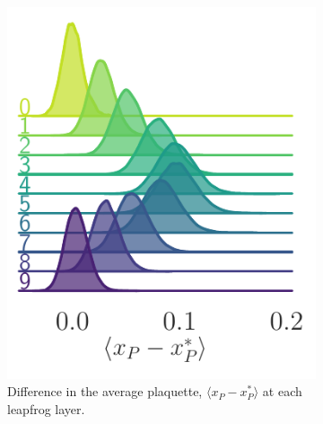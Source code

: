 \documentclass{article} %
\begin{document}
\begin{figure}[hbpt]
   \begin{subfigure}[b]{0.33\textwidth}
      \includegraphics[width=\textwidth]{figures/ridgeplots/plaqsf.pdf}
      \caption{\label{fig:plaqsf}Difference in the average plaquette, \(\langle x_{P}-x_{P}^{*}\rangle\) at each
      leapfrog layer.}
   \end{subfigure}
   \hfill
   \begin{subfigure}[b]{0.315\textwidth}

\end{subfigure}
\end{figure}
\end{document}

